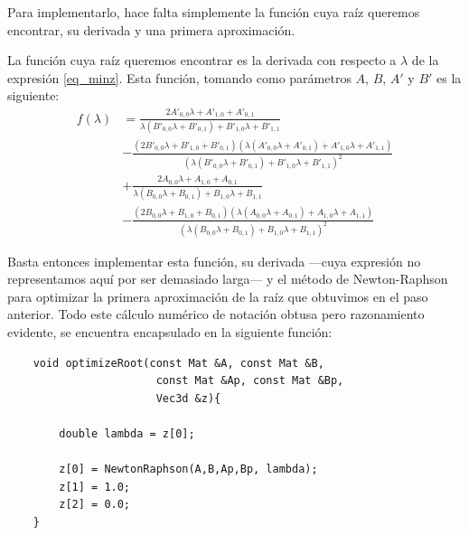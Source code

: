 \documentclass[a4paper, 11pt]{article}
\theoremstyle{definition}
\begin{document}
    Para implementarlo, hace falta simplemente la función cuya raíz queremos encontrar, su derivada y una primera aproximación.

    La función cuya raíz queremos encontrar es la derivada con respecto a $\lambda$ de la expresión \ref{eq_minz}. Esta función, tomando como parámetros $A$, $B$, $A'$ y $B'$ es la siguiente:
    \begin{align*}
    f(\lambda) &= \frac{2A'_{0,0}\lambda+A'_{1,0}+A'_{0,1}}{\lambda(B'_{0,0}\lambda+B'_{0,1})+B'_{1,0}\lambda+B'_{1,1}} \\
    &- \frac{(2B'_{0,0}\lambda+B'_{1,0}+B'_{0,1})(\lambda(A'_{0,0}\lambda+A'_{0,1})+A'_{1,0}\lambda+A'_{1,1})}{(\lambda(B'_{0,0}\lambda+B'_{0,1})+B'_{1,0}\lambda+B'_{1,1})^2} \\
    &+ \frac{2A_{0,0}\lambda+A_{1,0}+A_{0,1}}{\lambda(B_{0,0}\lambda+B_{0,1})+B_{1,0}\lambda+B_{1,1}} \\
    & - \frac{(2B_{0,0}\lambda+B_{1,0}+B_{0,1})(\lambda(A_{0,0}\lambda+A_{0,1})+A_{1,0}\lambda+A_{1,1})}{(\lambda(B_{0,0}\lambda+B_{0,1})+B_{1,0}\lambda+B_{1,1})^2}
    \end{align*}

    Basta entonces implementar esta función, su derivada ---cuya expresión no representamos aquí por ser demasiado larga--- y el método de Newton-Raphson para optimizar la primera aproximación de la raíz que obtuvimos en el paso anterior. Todo este cálculo numérico de notación obtusa pero razonamiento evidente, se encuentra encapsulado en la siguiente función:
    \begin{lstlisting}
    void optimizeRoot(const Mat &A, const Mat &B,
                       const Mat &Ap, const Mat &Bp,
                       Vec3d &z){

        double lambda = z[0];

        z[0] = NewtonRaphson(A,B,Ap,Bp, lambda);
        z[1] = 1.0;
        z[2] = 0.0;
    }
    \end{lstlisting}
\end{document}
